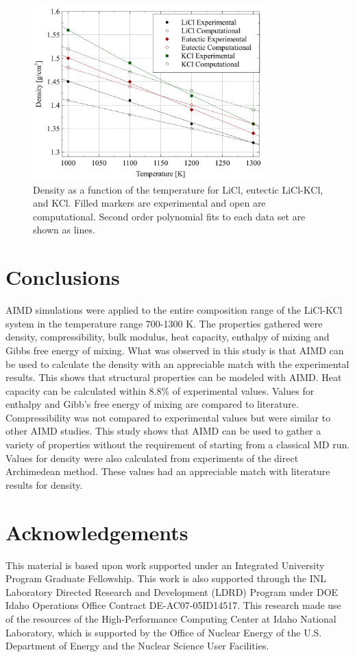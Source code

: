 \documentclass[review]{elsarticle}
\begin{document}
\begin{figure}[h]
 \centering
 \includegraphics[width=0.8\textwidth]{images/density_temp_comp.jpg} 
 \caption{Density as a function of the temperature for LiCl, eutectic LiCl-KCl, and KCl. Filled markers are experimental and open are computational. Second order polynomial fits to each data set are shown as lines. }
 \label{fig:densityCompTemp}
\end{figure} 
\FloatBarrier

\section{Conclusions}

AIMD simulations were applied to the entire composition range of the LiCl-KCl system in the temperature range 700-1300 K. The properties gathered were density, compressibility, bulk modulus, heat capacity, enthalpy of mixing and Gibbs free energy of mixing. What was observed in this study is that AIMD can be used to calculate the density with an appreciable match with the experimental results. This shows that structural properties can be modeled with AIMD. Heat capacity can be calculated within 8.8\% of experimental values. Values for enthalpy and Gibb's free energy of mixing are compared to literature. Compressibility was not compared to experimental values but were similar to other AIMD studies. This study shows that AIMD can be used to gather a variety of properties without the requirement of starting from a classical MD run. Values for density were also calculated from experiments of the direct Archimedean method. These values had an appreciable match with literature results for density.


\section{Acknowledgements}

This material is based upon work supported under an Integrated University Program Graduate Fellowship. This work is also supported through the INL Laboratory Directed Research and Development (LDRD) Program under DOE Idaho Operations Office Contract DE-AC07-05ID14517. This research made use of the resources of the High-Performance Computing Center at Idaho National Laboratory, which is supported by the Office of Nuclear Energy of the U.S. Department of Energy and the Nuclear Science User Facilities.    


\end{document}
